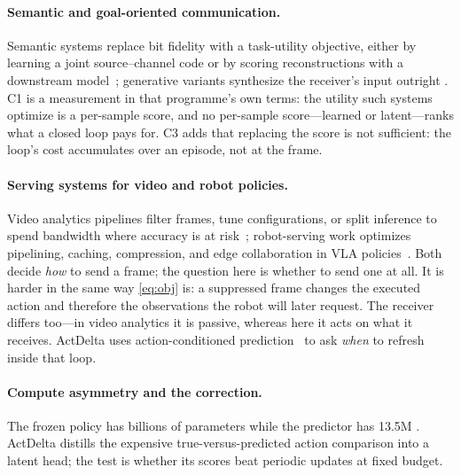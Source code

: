 \documentclass[sigconf,10pt,anonymous,review]{acmart}
\begin{document}
\paragraph{Semantic and goal-oriented communication.}
Semantic systems replace bit fidelity with a task-utility objective, either by
learning a joint source--channel code or by scoring reconstructions with a
downstream
model~\cite{bourtsoulatze2019djscc,gunduz2023beyond,kountouris2021semantics,li2025goal,yuan2025taskoriented};
generative variants synthesize the receiver's input outright
\cite{chen2025genvid,jiang2025semworld,liu2025residtok,wang2026worldtwin,yang2024agentdriven,yin2025genvideo}.
\textsf{C1} is a measurement in that programme's own terms: the utility such
systems optimize is a per-sample score, and no per-sample score---learned or
latent---ranks what a closed loop pays for. \textsf{C3} adds that replacing the
score is not sufficient: the loop's cost accumulates over an episode, not at
the frame.

\paragraph{Serving systems for video and robot policies.}
Video analytics pipelines filter frames, tune configurations, or split
inference to spend bandwidth where accuracy is at
risk~\cite{chen2015glimpse,du2020serverdriven,li2020reducto,zhang2018awstream};
robot-serving work optimizes pipelining, caching, compression, and edge
collaboration in
VLA policies~\cite{cao2026edgeserving,dai2025actionflow,julg2026vlagents,li2026oxygen,peng2026latency,agouzoul2026async,black2025realtime,gao2025compressorvla,kim2026learnedcomp,tang2025vlash,xu2025vlacache,zhu2026dinolink}.
Both decide \emph{how} to send a frame; the question here is whether to send
one at all. It is harder in the same way \cref{eq:obj} is: a suppressed frame
changes the executed action and therefore the observations the robot will later
request. The receiver differs too---in video analytics it is passive, whereas here it
acts on what it receives. ActDelta uses action-conditioned
prediction~\cite{bruce2024genie,hafner2023dreamerv3,ma2026pilworld,tang2026onetoken,wu2024ivideogpt}
to ask \emph{when} to refresh inside that loop.


\paragraph{Compute asymmetry and the correction.}
The frozen policy has billions of parameters while the predictor has 13.5M
\cite{black2024pi0,kim2024openvla,pi2025pi05}. ActDelta distills the expensive
true-versus-predicted action comparison into a latent head; the test is whether
its scores beat periodic updates at fixed budget.
\end{document}
